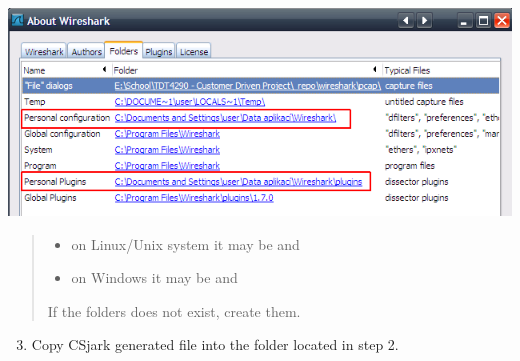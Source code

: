 \documentclass[A4paper,10pt,english]{sphinxmanual}
\begin{document}
{\hfill\includegraphics[width=\linewidth]{img/ws_about_folders.png}\hfill}
\begin{quote}
\begin{itemize}
\item {} 
on Linux/Unix system it may be   and  

\item {} 
on Windows it may be  
and 


\end{itemize}

If the folders does not exist, create them.
\end{quote}
\begin{enumerate}
\setcounter{enumi}{2}
\item {} 
Copy CSjark generated file  into the  folder located in step 2.

\end{enumerate}
\end{document}
